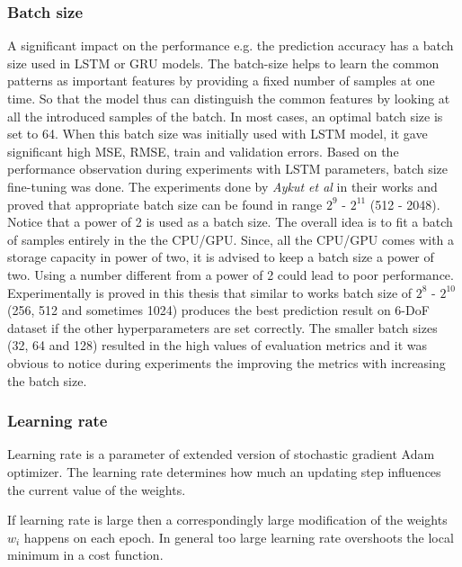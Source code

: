 \subsubsection{Batch size}
\label{sec:eval:experiments:early:batch}
A significant impact on the performance e.g. the prediction accuracy has a batch size used in LSTM or GRU models. The batch-size helps to learn the common patterns as important features by providing a fixed number of samples at one time. So that the model thus can distinguish the common features by looking at all the introduced samples of the batch. In most cases, an optimal batch size is set to 64. When this batch size was initially used with LSTM model, it gave significant high MSE, RMSE, train and validation errors. Based on the performance observation during experiments with LSTM parameters, batch size fine-tuning was done. The experiments done by \textit{Aykut et al} in their works \cite{delay_compensation_360} and \cite{telepresence} proved that appropriate batch size can be found in range $2^{9}$ - $2^{11}$ (512 - 2048). Notice that a power of 2 is used as a batch size. The overall idea is to fit a batch of samples entirely in the the CPU/GPU. Since, all the CPU/GPU comes with a storage capacity in power of two, it is advised to keep a batch size a power of two. Using a number different from a power of 2 could lead to poor performance. Experimentally is proved in this thesis that similar to works \cite{delay_compensation_360, telepresence}  batch size of $2^{8}$ - $2^{10}$ (256, 512 and sometimes 1024) produces the best prediction result on 6-DoF dataset if the other hyperparameters are set correctly. The smaller batch sizes (32, 64 and 128) resulted in the high values of evaluation metrics and it was obvious to notice during experiments the improving the metrics with increasing the batch size.

\subsubsection{Learning rate}
\label{sec:eval:experiments:early:lr}
Learning rate is a parameter of extended version of stochastic gradient Adam optimizer. The learning rate determines how much an updating step influences the current value of the weights. 

If learning rate is large then a correspondingly large modification of the weights $w_i$ happens on each epoch. In general too large learning rate overshoots the local minimum in a cost function.


